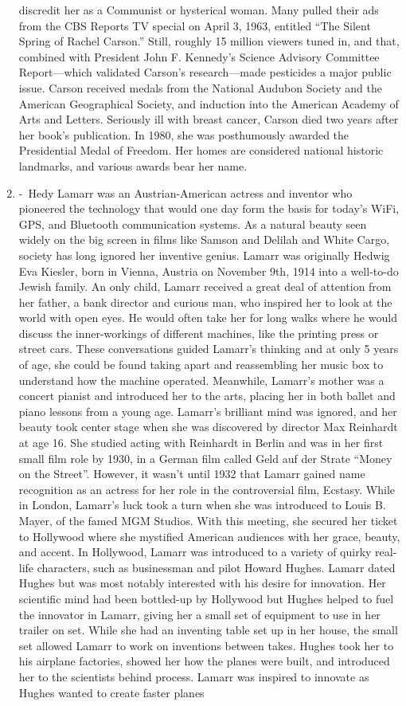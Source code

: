 \documentclass[12pt,a4paper]{article}
\begin{document}
\begin{enumerate}
discredit her as a Communist or hysterical woman. Many pulled their ads from the CBS Reports TV special on April 3, 1963, entitled ``The Silent Spring of Rachel Carson.'' Still, roughly 15 million viewers tuned in, and that, combined with President John F. Kennedy’s Science Advisory Committee Report—which validated Carson’s research—made pesticides a major public issue. Carson received medals from the National Audubon Society and the American Geographical Society, and induction into the American Academy of Arts and Letters.  Seriously ill with breast cancer, Carson died two years after her book’s publication. In 1980, she was posthumously awarded the Presidential Medal of Freedom. Her homes are considered national historic landmarks, and various awards bear her name.
    \item {} -\ Hedy Lamarr was an Austrian-American actress and inventor who pioneered the technology that would one day form the basis for today's WiFi, GPS, and Bluetooth communication systems. As a natural beauty seen widely on the big screen in films like Samson and Delilah and White Cargo, society has long ignored her inventive genius. Lamarr was originally Hedwig Eva Kiesler, born in Vienna, Austria on November 9th, 1914 into a well-to-do Jewish family. An only child, Lamarr received a great deal of attention from her father, a bank director and curious man, who inspired her to look at the world with open eyes. He would often take her for long walks where he would discuss the inner-workings of different machines, like the printing press or street cars. These conversations guided Lamarr’s thinking and at only 5 years of age, she could be found taking apart and reassembling her music box to understand how the machine operated. Meanwhile, Lamarr’s mother was a concert pianist and introduced her to the arts, placing her in both ballet and piano lessons from a young age. Lamarr's brilliant mind was ignored, and her beauty took center stage when she was discovered by director Max Reinhardt at age 16. She studied acting with Reinhardt in Berlin and was in her first small film role by 1930, in a German film called Geld auf der Strate ``Money on the Street''. However, it wasn't until 1932 that Lamarr gained name recognition as an actress for her role in the controversial film, Ecstasy. While in London, Lamarr's luck took a turn when she was introduced to Louis B. Mayer, of the famed MGM Studios. With this meeting, she secured her ticket to Hollywood where she mystified American audiences with her grace, beauty, and accent. In Hollywood, Lamarr was introduced to a variety of quirky real-life characters, such as businessman and pilot Howard Hughes. Lamarr dated Hughes but was most notably interested with his desire for innovation. Her scientific mind had been bottled-up by Hollywood but Hughes helped to fuel the innovator in Lamarr, giving her a small set of equipment to use in her trailer on set. While she had an inventing table set up in her house, the small set allowed Lamarr to work on inventions between takes. Hughes took her to his airplane factories, showed her how the planes were built, and introduced her to the scientists behind process. Lamarr was inspired to innovate as Hughes wanted to create faster planes 
\end{enumerate}
\end{document}
